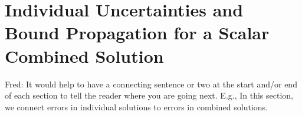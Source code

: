 \documentclass{article}[12pt]
\newcommand{\FJHComment}[1]{{\color{purple}Fred:  #1}}
\DeclareMathOperator{\Order}{{\mathcal O}}
\begin{document}

\section{Individual Uncertainties and Bound Propagation for a Scalar Combined Solution} \label{sec:comb_sol_approx}

\FJHComment{It would help to have a connecting sentence or two at the start and/or end of each section to tell the reader where you are going next.  E.g., In this section, we connect errors in individual solutions to errors in combined solutions.}
\end{document}
